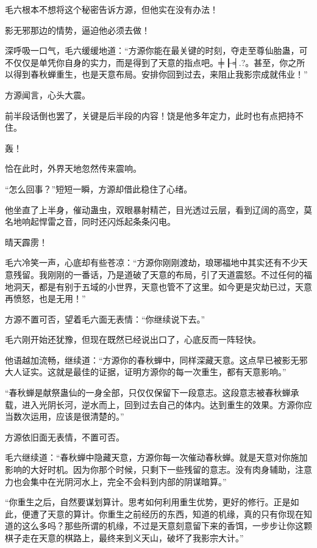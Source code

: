 
\begin{this_body}

毛六根本不想将这个秘密告诉方源，但他实在没有办法！

影无邪那边的情势，逼迫他必须去做！

深呼吸一口气，毛六缓缓地道：“方源你能在最关键的时刻，夺走至尊仙胎蛊，可不仅仅是单凭你自身的实力，而是得到了天意的指点吧。╪┠╡.?。甚至，你之所以得到春秋蝉重生，也是天意布局。安排你回到过去，来阻止我影宗成就伟业！”

方源闻言，心头大震。

前半段话倒也罢了，关键是后半段的内容！饶是他多年定力，此时也有点把持不住。

轰！

恰在此时，外界天地忽然传来震响。

“怎么回事？”短短一瞬，方源却借此稳住了心绪。

他坐直了上半身，催动蛊虫，双眼暴射精芒，目光透过云层，看到辽阔的高空，莫名地响起悍雷之音，同时还闪烁起条条闪电。

晴天霹雳！

毛六冷笑一声，心底却有些苍凉：“方源你刚刚渡劫，琅琊福地中其实还有不少天意残留。我刚刚的一番话，乃是道破了天意的布局，引了天道震怒。不过任何的福地洞天，都是有别于五域的小世界，天意也管不了这里。如今更是灾劫已过，天意再愤怒，也是无用！”

方源不置可否，望着毛六面无表情：“你继续说下去。”

毛六刚开始还犹豫，但现在既然已经说出口了，心底反而一阵轻快。

他语越加流畅，继续道：“方源你的春秋蝉中，同样深藏天意。这点早已被影无邪大人证实。这就是最佳的证据，证明方源你的每一次重生，都有天意影响。”

“春秋蝉是献祭蛊仙的一身全部，只仅仅保留下一段意志。这段意志被春秋蝉承载，进入光阴长河，逆水而上，回到过去自己的体内。达到重生的效果。方源你应当数次运用，应该是很清楚的。”

方源依旧面无表情，不置可否。

毛六继续道：“春秋蝉中隐藏天意，方源你每一次催动春秋蝉。就是天意对你施加影响的大好时机。因为你那个时候，只剩下一些残留的意志。没有肉身辅助，注意力也会集中在光阴河水上，完全不会料到内部的阴谋暗算。”

“你重生之后，自然要谋划算计。思考如何利用重生优势，更好的修行。正是如此，便遭了天意的算计。你重生之前经历的东西，知道的机缘，真的只有你现在知道的这么多吗？那些所谓的机缘，不过是天意刻意留下来的香饵，一步步让你这颗棋子走在天意的棋路上，最终来到义天山，破坏了我影宗大计。”


\end{this_body}
